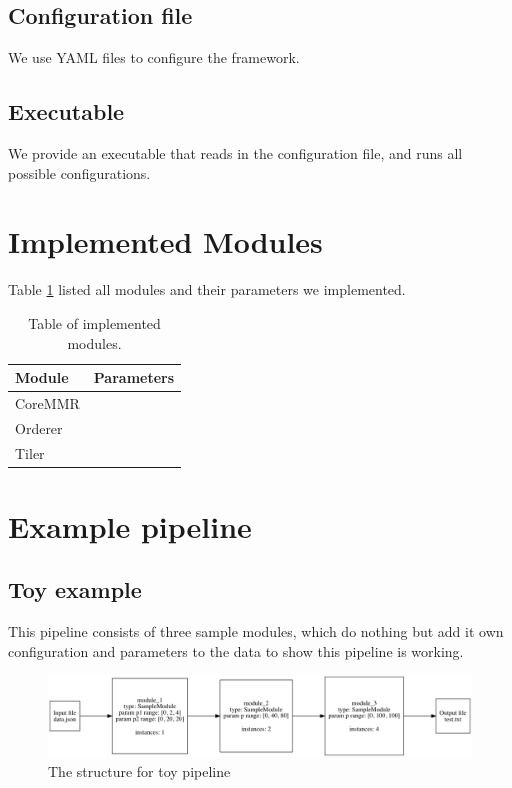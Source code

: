 \documentclass{article}
\begin{document}
    \subsection{Configuration file}
    We use YAML files to configure the framework.

    \subsection{Executable}
    We provide an executable that reads in the configuration file, and runs all possible configurations.

\section{Implemented Modules}

    Table \ref{tbl:modules} listed all modules and their parameters we implemented.

    \begin{table}[h]
        \centering
        \begin{tabular}{|l|l|}
            \hline
            Module  & Parameters \\ \hline
            CoreMMR &            \\ \hline
            Orderer &            \\ \hline
            Tiler   &            \\ \hline
        \end{tabular}
        \caption{Table of implemented modules.}
        \label{tbl:modules}
    \end{table}

\section{Example pipeline}
    \subsection{Toy example}
    This pipeline consists of three sample modules,
    which do nothing but add it own configuration and parameters to the data to show this pipeline is working.

    \begin{figure}[H]
        \begin{center}
            \includegraphics[width=\textwidth]{fig/toy_pipeline.png}
        \end{center}
        \label{fig:toy_pipeline}
        \caption{The structure for toy pipeline}
    \end{figure}
\end{document}

